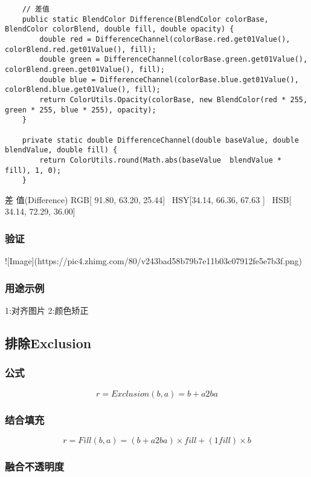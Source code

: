 \begin{lstlisting}
	// 差值
	public static BlendColor Difference(BlendColor colorBase, BlendColor colorBlend, double fill, double opacity) {
		double red = DifferenceChannel(colorBase.red.get01Value(), colorBlend.red.get01Value(), fill);
		double green = DifferenceChannel(colorBase.green.get01Value(), colorBlend.green.get01Value(), fill);
		double blue = DifferenceChannel(colorBase.blue.get01Value(), colorBlend.blue.get01Value(), fill);
		return ColorUtils.Opacity(colorBase, new BlendColor(red * 255, green * 255, blue * 255), opacity);
	}
	
	private static double DifferenceChannel(double baseValue, double blendValue, double fill) {
		return ColorUtils.round(Math.abs(baseValue  blendValue * fill), 1, 0);
	}
\end{lstlisting}




差    值(Difference)    RGB[ 91.80,  63.20,  25.44]~ HSY[34.14,  66.36,  67.63 ]~ HSB[ 34.14,  72.29,  36.00]


\subsubsection{ 验证}

![Image](https://pic4.zhimg.com/80/v243bad58b79b7e11b03c07912fe5e7b3f.png)

\subsubsection{ 用途示例}

1:对齐图片
2:颜色矫正

\subsection{ 排除Exclusion}

\subsubsection{ 公式}

$$r=Exclusion(b,a)=b+a2ba$$

\subsubsection{ 结合填充}

$$r=Fill(b,a)=(b+a2ba)\times fill + (1fill)\times b$$

\subsubsection{ 融合不透明度}

